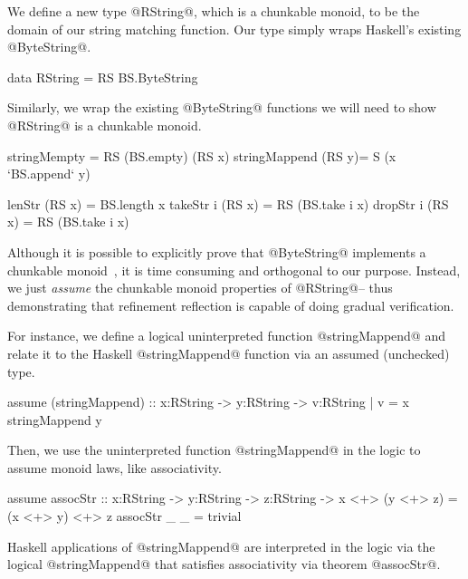 We define a new type @RString@, which is a chunkable monoid, to be the
domain of our string matching function. Our type simply wraps
Haskell's existing @ByteString@.
\begin{code}
data RString = RS BS.ByteString
\end{code}
Similarly, we wrap the existing @ByteString@ functions we will need to
show @RString@ is a chunkable monoid.
\begin{code}
stringMempty = RS (BS.empty)
(RS x) stringMappend (RS y)= S (x `BS.append` y)

lenStr    (RS x) = BS.length x
takeStr i (RS x) = RS (BS.take i x)
dropStr i (RS x) = RS (BS.take i x)
\end{code}
Although it is possible to explicitly prove that @ByteString@
implements a chunkable monoid~\cite{realworldliquid14}, it is time
consuming and orthogonal to our purpose. Instead, we
just \textit{assume} the chunkable monoid properties of @RString@--
thus demonstrating that refinement reflection is capable of doing
gradual verification.



For instance, we define a logical uninterpreted function
@stringMappend@ and relate it to the Haskell @stringMappend@ function
via an assumed (unchecked) type.
%
\begin{code}
assume (stringMappend)
  :: x:RString -> y:RString -> {v:RString | v = x stringMappend y}
\end{code}
%
Then, we use the uninterpreted function @stringMappend@ in the logic
to assume monoid laws, like associativity.
%
\begin{code}
assume assocStr :: x:RString -> y:RString -> z:RString
                 -> { x <+> (y <+> z) = (x <+> y) <+> z }
assocStr _ _     = trivial
\end{code}
%
Haskell applications of @stringMappend@ are interpreted in the logic
via the logical @stringMappend@ that satisfies associativity via theorem @assocStr@.

